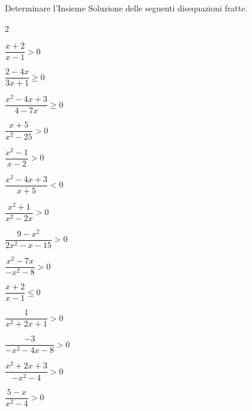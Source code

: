 
\begin{esercizio}[*]
\label{ese:4.58}
Determinare l'Insieme Soluzione delle seguenti disequazioni fratte.
\begin{htmulticols}{2}
\begin{enumeratea}
\item \(\dfrac{x+2}{x-1}>0\) 
\item \(\dfrac{2-4x}{3x+1} \geqslant 0\) 
\item \(\dfrac{x^2-4x+3}{4-7x} \geqslant 0\) 
\item \(\dfrac{x+5}{x^2-25}>0\) 
\item \(\dfrac{x^2-1}{x-2}>0\) 
\item \(\dfrac{x^2-4x+3}{x+5}<0\) 
\item \(\dfrac{x^2+1}{x^2-2x}>0\) 
\item \(\dfrac{9-x^2}{2x^2-x-15}>0\) 
\item \(\dfrac{x^2-7x}{-x^2-8}>0\) 
\item \(\dfrac{x+2}{x-1} \leqslant 0\) 
\item \(\dfrac 1{x^2+2x+1}>0\) 
\item \(\dfrac{-3}{-x^2-4x-8}>0\) \sol{\R}
\item \(\dfrac{x^2+2x+3}{-x^2-4}>0\) \sol{\emptyset}
\item \(\dfrac{5-x}{x^2-4}>0\) 
\end{enumeratea}
\end{htmulticols}
\end{esercizio}

